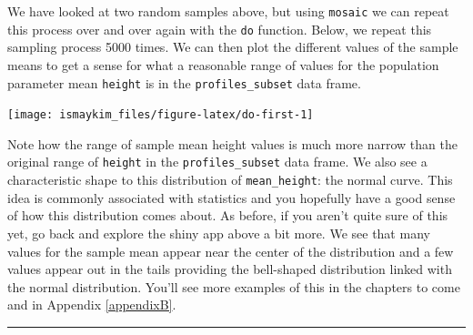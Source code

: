 \documentclass[]{tufte-book}
\newenvironment{Shaded}{\begin{snugshade}}{\end{snugshade}}
\newcommand{\KeywordTok}[1]{\textcolor[rgb]{0.13,0.29,0.53}{\textbf{{#1}}}}
\newcommand{\DataTypeTok}[1]{\textcolor[rgb]{0.13,0.29,0.53}{{#1}}}
\newcommand{\DecValTok}[1]{\textcolor[rgb]{0.00,0.00,0.81}{{#1}}}
\newcommand{\StringTok}[1]{\textcolor[rgb]{0.31,0.60,0.02}{{#1}}}
\newcommand{\OtherTok}[1]{\textcolor[rgb]{0.56,0.35,0.01}{{#1}}}
\newcommand{\NormalTok}[1]{{#1}}
\let\oldrule=\rule
\renewcommand{\rule}[1]{\oldrule{\linewidth}}
\begin{document}
We have looked at two random samples above, but using \texttt{mosaic} we
can repeat this process over and over again with the \texttt{do}
function. Below, we repeat this sampling process 5000 times. We can then
plot the different values of the sample means to get a sense for what a
reasonable range of values for the population parameter mean
\texttt{height} is in the \texttt{profiles\_subset} data frame.

\begin{Shaded}
\end{Shaded}

\begin{center}\texttt{[image: ismaykim\_files/figure-latex/do-first-1]} \end{center}

Note how the range of sample mean height values is much more narrow than
the original range of \texttt{height} in the \texttt{profiles\_subset}
data frame. We also see a characteristic shape to this distribution of
\texttt{mean\_height}: the normal curve. This idea is commonly
associated with statistics and you hopefully have a good sense of how
this distribution comes about. As before, if you aren't quite sure of
this yet, go back and explore the shiny app above a bit more. We see
that many values for the sample mean appear near the center of the
distribution and a few values appear out in the tails providing the
bell-shaped distribution linked with the normal distribution. You'll see
more examples of this in the chapters to come and in Appendix
\ref{appendixB}.

\begin{center}\rule{0.5\linewidth}{\linethickness}\end{center}
\end{document}
